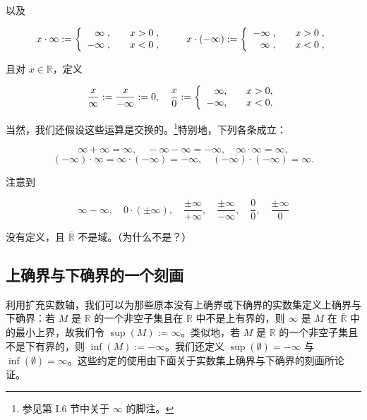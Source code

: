 以及

\begin{equation*}
x\cdot\infty:=\left\{\begin{array}{r r}{\infty\;,}&{\quad x>0\;,}\\ {-\infty\;,}&{\quad x<0\;,}\\ \end{array}\right.\qquad x\cdot(-\infty):=\left\{\begin{array}{r r}{-\infty\;,}&{\quad x>0\;,}\\ {\infty\;,}&{\quad x<0\;,}\\ \end{array}\right.
\end{equation*}

且对 $ x \in \mathbb{R} $，定义

\begin{equation*}
\frac{x}{\infty}:=\frac{x}{-\infty}:=0,\quad\frac{x}{0}:=\left\{\begin{array}{r r}{\infty,}&{\quad x>0,}\\ {-\infty,}&{\quad x<0.}\end{array}\right.
\end{equation*}

当然，我们还假设这些运算是交换的。\footnote{参见第 I.6 节中关于 $\infty$ 的脚注。}特别地，下列各条成立：

\[
\infty+\infty=\infty,\quad-\infty-\infty=-\infty,\quad\infty\cdot\infty=\infty,
\]
\[
(-\infty)\cdot\infty=\infty\cdot(-\infty)=-\infty,\quad(-\infty)\cdot(-\infty)=\infty.
\]

注意到

\[
\infty-\infty,\quad0\cdot(\pm\infty),\quad\frac{\pm\infty}{+\infty},\quad\frac{\pm\infty}{-\infty},\quad\frac{0}{0},\quad\frac{\pm\infty}{0}
\]

没有定义，且 $ \bar{\mathbb{R}} $ 不是域。（为什么不是？）

\subsection*{上确界与下确界的一个刻画}

利用扩充实数轴，我们可以为那些原本没有上确界或下确界的实数集定义上确界与下确界：若 $ M $ 是 $ \mathbb{R} $ 的一个非空子集且在 $ \mathbb{R} $ 中不是上有界的，则 $ \infty $ 是 $ M $ 在 $ \bar{\mathbb{R}} $ 中的最小上界，故我们令 $ \sup(M) := \infty $。类似地，若 $ M $ 是 $ \mathbb{R} $ 的一个非空子集且不是下有界的，则 $ \inf(M) := -\infty $。我们还定义 $ \sup(\emptyset) = -\infty $ 与 $ \inf(\emptyset) = \infty $。这些约定的使用由下面关于实数集上确界与下确界的刻画所论证。

